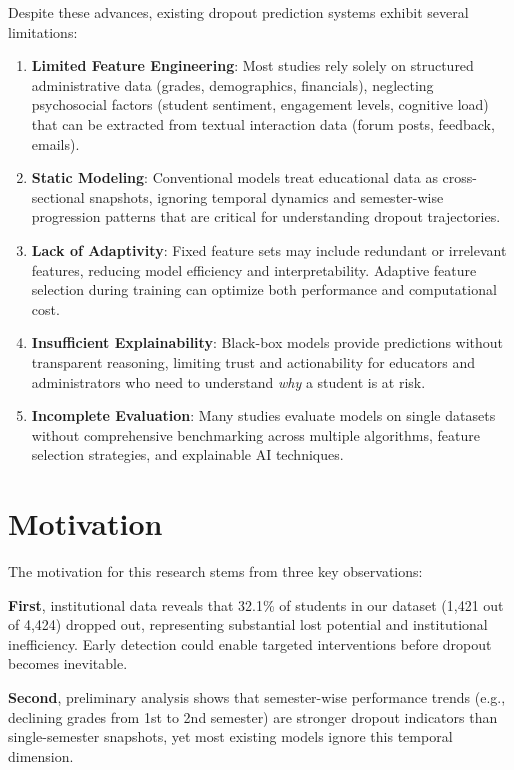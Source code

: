 Despite these advances, existing dropout prediction systems exhibit several limitations:

\begin{enumerate}
    \item \textbf{Limited Feature Engineering}: Most studies rely solely on structured administrative data (grades, demographics, financials), neglecting psychosocial factors (student sentiment, engagement levels, cognitive load) that can be extracted from textual interaction data (forum posts, feedback, emails).
    
    \item \textbf{Static Modeling}: Conventional models treat educational data as cross-sectional snapshots, ignoring temporal dynamics and semester-wise progression patterns that are critical for understanding dropout trajectories.
    
    \item \textbf{Lack of Adaptivity}: Fixed feature sets may include redundant or irrelevant features, reducing model efficiency and interpretability. Adaptive feature selection during training can optimize both performance and computational cost.
    
    \item \textbf{Insufficient Explainability}: Black-box models provide predictions without transparent reasoning, limiting trust and actionability for educators and administrators who need to understand \textit{why} a student is at risk.
    
    \item \textbf{Incomplete Evaluation}: Many studies evaluate models on single datasets without comprehensive benchmarking across multiple algorithms, feature selection strategies, and explainable AI techniques.
\end{enumerate}

\section{Motivation}

The motivation for this research stems from three key observations:

\textbf{First}, institutional data reveals that 32.1\% of students in our dataset (1,421 out of 4,424) dropped out, representing substantial lost potential and institutional inefficiency. Early detection could enable targeted interventions before dropout becomes inevitable.

\textbf{Second}, preliminary analysis shows that semester-wise performance trends (e.g., declining grades from 1st to 2nd semester) are stronger dropout indicators than single-semester snapshots, yet most existing models ignore this temporal dimension.

